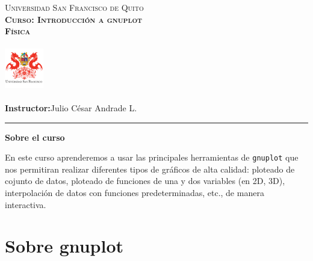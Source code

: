 \documentclass[11.5pt,a4paper]{article}
\begin{document}
\frenchspacing
\begin{center}
	\begin{minipage}{9.4cm}
		\begin{center}
				{\textsc{Universidad San Francisco de Quito}\\
						  \textsc{\textbf{Curso: Introducción a gnuplot}}\\
						  \textsc{\textbf{Física}} \\
                }
		\end{center}
	\end{minipage}
	    \begin{minipage}{1.8cm}
		\begin{center}
			\includegraphics[width=1.7cm, height=2.0cm]{logo.png}
		\end{center}
	\end{minipage}
\end{center}

\thispagestyle{empty}\bigskip
\setlength{\marginparwidth}{5cm}
\small \noindent \textbf{Instructor:}\hspace{0.3cm}Julio César Andrade L.\\

\thispagestyle{empty}\bigskip

\par\noindent\rule{\textwidth}{0.4pt}
\vspace{0.5cm}
\begin{center}
\textbf{\large Sobre el curso} 
\end{center}
\vspace{0.5cm}

\small
En este curso aprenderemos a usar las principales herramientas de \texttt{gnuplot} que nos permitiran realizar diferentes tipos de gráficos de alta calidad: ploteado de cojunto de datos, ploteado de funciones de una y dos variables (en 2D, 3D), interpolación de datos con funciones predeterminadas, etc., de manera interactiva. 
\vspace{0.5cm}
\normalsize

\section{Sobre gnuplot}
\end{document}
